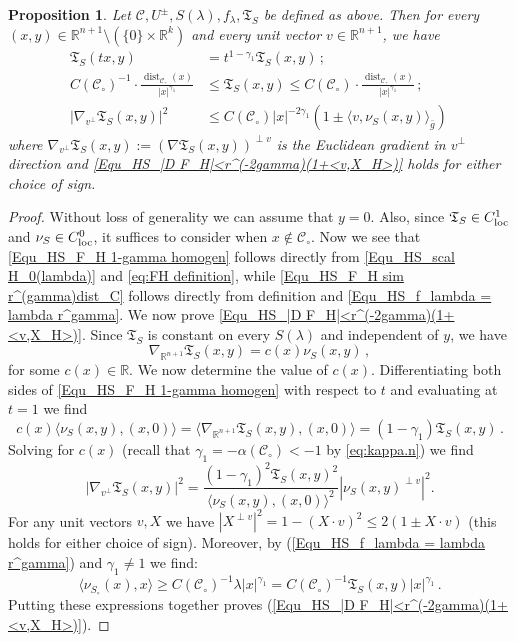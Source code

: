 \documentclass[11pt, letterpaper, reqno]{amsart}
\numberwithin{equation}{section}
\newtheorem{Prop}[Def]{Proposition}
\theoremstyle{remark}
\newcommand{\RR}{\mathbb{R}}
\newcommand{\cC}{\mathcal{C}}
\newcommand{\frT}{\mathfrak{T}}
\newcommand{\dist}{\operatorname{dist}}
\begin{document}
   \begin{Prop}\label{Prop_HS_Est of F_H and |D F_H|}
     Let $\cC, U^\pm, {S}(\lambda), f_\lambda, \frT_{{S}}$ be defined as above.
     Then for every $(x, y)\in \RR^{n+1}\setminus(\{0\}\times \RR^k)$ and every unit vector $v\in \RR^{n+1}$, we have
     \begin{align}
        \frT_{{S}}(t x, y) & = t^{1-\gamma_1} \frT_{{S}}(x, y)\,; \label{Equ_HS_F_H 1-gamma homogen} \\
        C(\cC_\circ)^{-1}\cdot\frac{\dist_{\cC_\circ}(x)}{|x|^{\gamma_1}} & \leq \frT_{{S}}(x, y) \leq C(\cC_\circ)\cdot\frac{\dist_{\cC_\circ}(x)}{|x|^{\gamma_1}}\,; \label{Equ_HS_F_H sim r^(gamma)dist_C} \\
        |\nabla_{v^{\perp}}\frT_{{S}}(x, y)|^2 & \leq C(\cC_\circ) |x|^{-2\gamma_1}\left(1\pm \langle v, \nu_{{S}}(x, y) \rangle_{\bar g} \right) \label{Equ_HS_|D F_H|<r^(-2gamma)(1+<v,X_H>)}\,
     \end{align}
     where $\nabla_{v^{\perp}}\frT_{{S}}(x, y) := (\nabla \frT_{{S}}(x, y))^{\perp v}$ is the Euclidean gradient in $v^\perp$ direction and \eqref{Equ_HS_|D F_H|<r^(-2gamma)(1+<v,X_H>)} holds for either choice of sign.
   \end{Prop}
   \begin{proof}
     Without loss of generality we can assume that $y=0$. Also, since $\frT_{{S}}\in C^1_{\textnormal{loc}}$ and $\nu_{{S}}\in C^0_{\textnormal{loc}}$, it suffices to consider when $x\notin \cC_\circ$. Now we see that \eqref{Equ_HS_F_H 1-gamma homogen} follows directly from \eqref{Equ_HS_scal H_0(lambda)} and \eqref{eq:FH definition}, while \eqref{Equ_HS_F_H sim r^(gamma)dist_C} follows directly from definition and \eqref{Equ_HS_f_lambda = lambda r^gamma}. We now prove \eqref{Equ_HS_|D F_H|<r^(-2gamma)(1+<v,X_H>)}. Since $\frT_{{S}}$ is constant on every ${S}(\lambda)$  and independent of $y$, we have \[
       \nabla_{\RR^{n+1}}\frT_{{S}}(x, y) = c(x) \nu_{{S}}(x, y) \,,  \]
     for some $c(x)\in \RR$. We now determine the value of $c(x)$. 
    Differentiating both sides of \eqref{Equ_HS_F_H 1-gamma homogen} with respect to $t$ and evaluating at $t=1$ we find \[
       c(x)\langle \nu_{{S}}(x, y), (x, 0) \rangle = \langle \nabla_{\RR^{n+1}}\frT_{{S}}(x, y), (x, 0) \rangle = (1-\gamma_1)\frT_{{S}}(x, y) \,.
     \]
     Solving for $c(x)$ (recall that $\gamma_1 = -\alpha(\cC_\circ)<-1$ by \eqref{eq:kappa.n}) we find 
     \[
     |\nabla_{v^\perp} \frT_{{S}}(x,y)|^2  = \frac{(1-\gamma_1)^2 \frT_{{S}}(x, y)^2}{\langle \nu_{{S}}(x,y),(x,0)\rangle^2}|\nu_{{S}}(x,y)^{\perp v}|^2.
     \]
     For any unit vectors $v,X$ we have $|X^{\perp v}|^2 = 1-(X\cdot v)^2 \leq 2(1\pm X\cdot v)$ (this holds for either choice of sign). Moreover, by (\ref{Equ_HS_f_lambda = lambda r^gamma}) and $\gamma_1 \neq 1$ we find: \[
       \langle \nu_{{S}_\circ}(x), x\rangle \geq C(\cC_\circ)^{-1} \lambda |x|^{\gamma_1} = C(\cC_\circ)^{-1} \frT_{{S}}(x, y) |x|^{\gamma_1}  \,.
     \]
     Putting these expressions together proves (\ref{Equ_HS_|D F_H|<r^(-2gamma)(1+<v,X_H>)}).     
   \end{proof}
   
\end{document}
